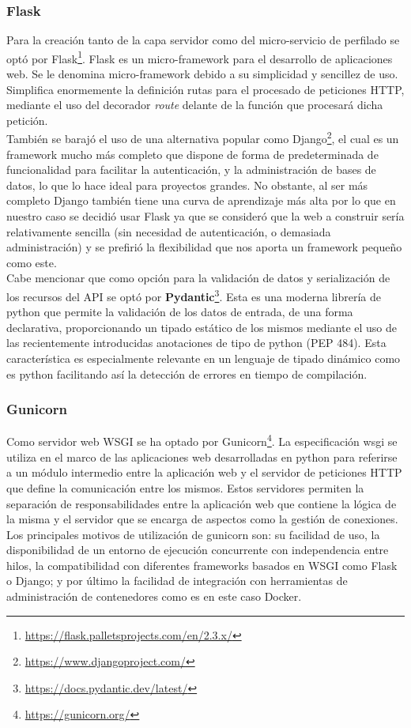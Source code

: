 \subsubsection{Flask}
Para la creación tanto de la capa servidor como del micro-servicio de perfilado se optó por Flask\footnote{\url{https://flask.palletsprojects.com/en/2.3.x/}}. Flask es un micro-framework para el desarrollo de aplicaciones web. Se le denomina micro-framework debido a su simplicidad y sencillez de uso. Simplifica enormemente la definición rutas para el procesado de peticiones HTTP, mediante el uso del decorador \textit{route} delante de la función que procesará dicha petición. \\ También se barajó el uso de una alternativa popular como Django\footnote{\url{https://www.djangoproject.com/}}, el cual es un framework mucho más completo que dispone de forma de predeterminada de funcionalidad para facilitar la autenticación, y la administración de bases de datos, lo que lo hace ideal para proyectos grandes. No obstante, al ser más completo Django también tiene una curva de aprendizaje más alta por lo que en nuestro caso se decidió usar Flask ya que se consideró que la web a construir sería relativamente sencilla (sin necesidad de autenticación, o demasiada administración) y se prefirió la flexibilidad que nos aporta un framework pequeño como este.\\
Cabe mencionar que como opción para la validación de datos y serialización de los recursos del API se optó por \textbf{Pydantic}\footnote{\url{https://docs.pydantic.dev/latest/}}. Esta es una moderna librería de python que permite la validación de los datos de entrada, de una forma declarativa, proporcionando un tipado estático de los mismos mediante el uso de las recientemente introducidas anotaciones de tipo de python (PEP 484). Esta característica es especialmente relevante en un lenguaje de tipado dinámico como es python facilitando así la detección de errores en tiempo de compilación.\\
\subsubsection{Gunicorn}
Como servidor web WSGI se ha optado por Gunicorn\footnote{\url{https://gunicorn.org/}}. La especificación \acrfull{wsgi} se utiliza en el marco de las aplicaciones web desarrolladas en python para referirse a un módulo intermedio entre la aplicación web y el servidor de peticiones HTTP que define la comunicación entre los mismos. Estos servidores permiten la separación de responsabilidades entre la aplicación web que contiene la lógica de la misma y el servidor que se encarga de aspectos como la gestión de conexiones.\\
Los principales motivos de utilización de gunicorn son: su facilidad de uso, la disponibilidad de un entorno de ejecución concurrente con independencia entre hilos, la compatibilidad con diferentes frameworks basados en WSGI como Flask o Django; y por último la facilidad de integración con herramientas de administración de contenedores como es en este caso Docker.\\

